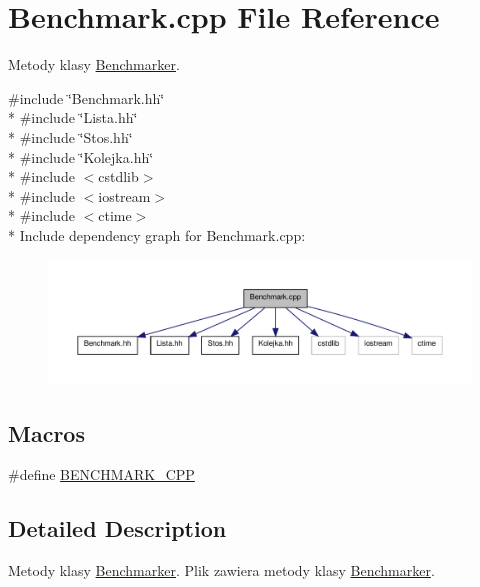 \hypertarget{a00005}{\section{Benchmark.\-cpp File Reference}
\label{a00005}
}


Metody klasy \hyperlink{a00001}{Benchmarker}.  


{\ttfamily \#include \char`\"{}Benchmark.\-hh\char`\"{}}\\*
{\ttfamily \#include \char`\"{}Lista.\-hh\char`\"{}}\\*
{\ttfamily \#include \char`\"{}Stos.\-hh\char`\"{}}\\*
{\ttfamily \#include \char`\"{}Kolejka.\-hh\char`\"{}}\\*
{\ttfamily \#include $<$cstdlib$>$}\\*
{\ttfamily \#include $<$iostream$>$}\\*
{\ttfamily \#include $<$ctime$>$}\\*
Include dependency graph for Benchmark.\-cpp\-:\nopagebreak
\begin{figure}[H]
\begin{center}
\leavevmode
\includegraphics[width=350pt]{a00016}
\end{center}
\end{figure}
\subsection*{Macros}
\begin{DoxyCompactItemize}
\item 
\#define \hyperlink{a00005_af899221e0ac3b868dd9a8298bd9b1f12}{B\-E\-N\-C\-H\-M\-A\-R\-K\-\_\-\-C\-P\-P}
\end{DoxyCompactItemize}


\subsection{Detailed Description}
Metody klasy \hyperlink{a00001}{Benchmarker}. Plik zawiera metody klasy \hyperlink{a00001}{Benchmarker}. 

